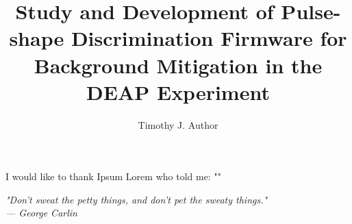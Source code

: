 \documentclass[masters]{ucbthesis}
\begin{document}
\title{Study and Development of Pulse-shape Discrimination Firmware for Background Mitigation in the DEAP Experiment}
\author{Timothy J. Author}



\maketitle




\begin{frontmatter}

\tableofcontents
\clearpage
\listoffigures
\clearpage
\listoftables
\clearpage
\printglossary[title=Table of Symbols]

\begin{acknowledgements}
I would like to thank Ipsum Lorem who told me: "\blindtext"
\end{acknowledgements}

\begin{dedication}
	\null\vfil
	\begin{center}
		\textit{
		"Don't sweat the petty things, and don't pet the sweaty things."\\
		--- George Carlin
		}
	\end{center}
	\vfil\null
\end{dedication}


\end{frontmatter}
\pagestyle{headings}

%
%
%
%
%
\nocite{*}
\printbibliography
%
\end{document}
